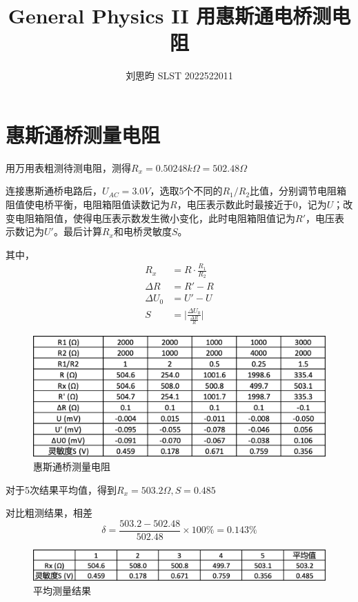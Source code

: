\documentclass{article}
\author{刘思昀 SLST 2022522011}
\title{General Physics II 用惠斯通电桥测电阻}
\begin{document}
\date{}

\maketitle

\section{惠斯通桥测量电阻}
用万用表粗测待测电阻，测得$R_x=0.50248 k\Omega = 502.48\Omega$

连接惠斯通桥电路后，$U_{AC} = 3.0 V$，选取5个不同的$R_1 / R_2$比值，分别调节电阻箱阻值使电桥平衡，电阻箱阻值读数记为$R$，电压表示数此时最接近于0，记为$U$；改变电阻箱阻值，使得电压表示数发生微小变化，此时电阻箱阻值记为$R'$，电压表示数记为$U'$。最后计算$R_x$和电桥灵敏度$S$。

其中，
\begin{align*}
    R_x &= R \cdot \frac{R_1}{R_2} \\
    \Delta R &= R' - R \\
    \Delta U_0 &= U' - U \\
    S &= \lvert \frac{\Delta U_0}{\frac{\Delta R}{R}} \rvert
\end{align*}

\begin{figure}[htbp]
    \centering
    \includegraphics[width=1.0\textwidth]{1-1.png}
    \caption{惠斯通桥测量电阻}
\end{figure}

对于5次结果平均值，得到$R_x = 503.2 \Omega, S = 0.485$

对比粗测结果，相差
\begin{equation*}
    \delta = \frac{503.2 - 502.48}{502.48} \times 100 \% = 0.143 \%
\end{equation*}

\begin{figure}[htbp]
    \centering
    \includegraphics[width=1.0\textwidth]{1-2.png}
    \caption{平均测量结果}
\end{figure}
\end{document}
